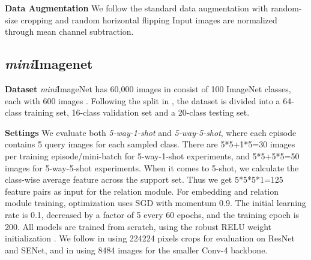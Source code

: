 \documentclass[conference]{IEEEtran}
\def\modelnameshort{DCN}
\def\miniIN{\textit{mini}ImageNet}
\def\imagenet{ImageNet}
\newcommand{\cut}[1]{}
\newcommand{\keypoint}[1]{\vspace{0.05cm}\noindent\textbf{#1}\quad}
\begin{document}
\keypoint{Data Augmentation}
We follow the standard data augmentation \cite{szegedy2015going,hu2018senet, he2016deep, chen2019closerfewshot} with random-size cropping and random horizontal flipping
Input images are normalized through mean channel subtraction.

\cut{\keypoint{Pre-train and train}
The embedding branch is pre-trained by the training set and the parameters then are fixed. The validation set is used to estimate the number of early stop episodes for the relation training. Finally, both train and validation data (as per common practice \cite{qiao2017few}) are used to train the relation modules in \modelnameshort{}.}

\subsection{\textit{mini}Imagenet}
\keypoint{Dataset}
\miniIN{} has 60,000 images in consist of 100 \imagenet{} classes, each with 600 images  \cite{vinyals2016matching}. Following the split in \cite{ravi2017optimization}, the dataset is divided into a 64-class training set, 16-class validation set and a 20-class testing set.

\keypoint{Settings}
We evaluate both \textit{5-way-1-shot} and \textit{5-way-5-shot}, where each episode contains 5 query images for each sampled class. There are 5*5+1*5=30 images per training episode/mini-batch for 5-way-1-shot experiments, and 5*5+5*5=50 images for 5-way-5-shot experiments. When it comes to 5-shot, we calculate the class-wise average feature across the support set. Thus we get 5*5*5*1=125 feature pairs as input for the relation module.
For embedding and relation module training, optimization uses SGD with momentum 0.9. The initial learning rate is 0.1, decreased by a factor of 5 every 60 epochs, and the training epoch is 200. All models are trained from scratch, using the robust RELU weight initialization \cite{he2015delving}. We follow \cite{chen2019closerfewshot} in using 224224 pixels crops for evaluation on ResNet and SENet, and \cite{ravi2017optimization} in using 8484 images for the smaller Conv-4 backbone.
\end{document}
